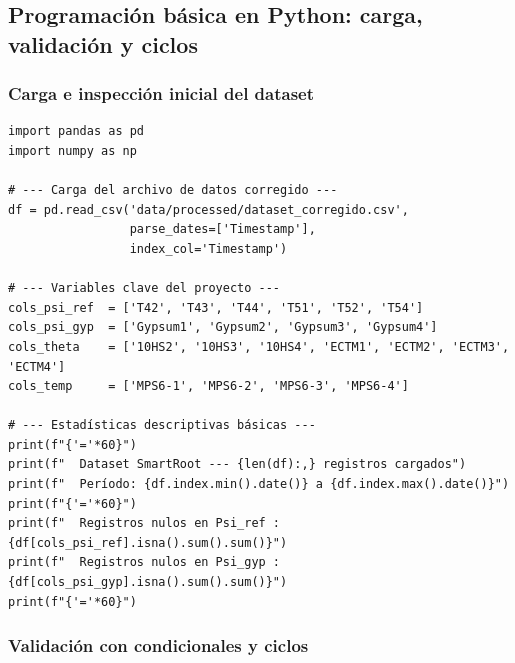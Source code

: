 \documentclass[12pt,a4paper]{article}
\begin{document}
\subsection{Programación básica en Python: carga, validación y ciclos}

\subsubsection{Carga e inspección inicial del dataset}

\begin{lstlisting}[caption={Carga del dataset y validación básica de integridad.}, label=lst:carga]
import pandas as pd
import numpy as np

# --- Carga del archivo de datos corregido ---
df = pd.read_csv('data/processed/dataset_corregido.csv', 
                 parse_dates=['Timestamp'], 
                 index_col='Timestamp')

# --- Variables clave del proyecto ---
cols_psi_ref  = ['T42', 'T43', 'T44', 'T51', 'T52', 'T54']
cols_psi_gyp  = ['Gypsum1', 'Gypsum2', 'Gypsum3', 'Gypsum4']
cols_theta    = ['10HS2', '10HS3', '10HS4', 'ECTM1', 'ECTM2', 'ECTM3', 'ECTM4']
cols_temp     = ['MPS6-1', 'MPS6-2', 'MPS6-3', 'MPS6-4']

# --- Estadísticas descriptivas básicas ---
print(f"{'='*60}")
print(f"  Dataset SmartRoot --- {len(df):,} registros cargados")
print(f"  Período: {df.index.min().date()} a {df.index.max().date()}")
print(f"{'='*60}")
print(f"  Registros nulos en Psi_ref : {df[cols_psi_ref].isna().sum().sum()}")
print(f"  Registros nulos en Psi_gyp : {df[cols_psi_gyp].isna().sum().sum()}")
print(f"{'='*60}")
\end{lstlisting}

\subsubsection{Validación con condicionales y ciclos}
\end{document}
